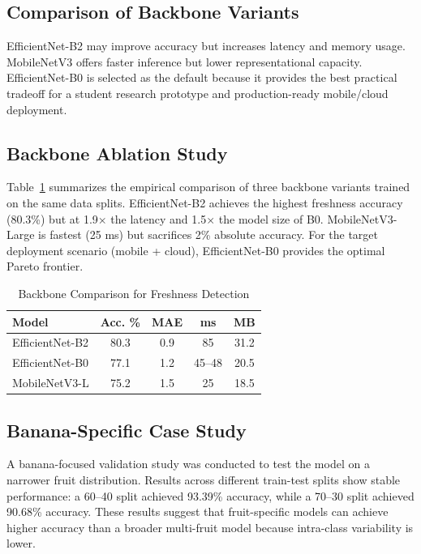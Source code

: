 \documentclass[conference]{IEEEtran}
\begin{document}
\subsection{Comparison of Backbone Variants}
EfficientNet-B2 may improve accuracy but increases latency and memory usage. MobileNetV3 offers faster inference but lower representational capacity. EfficientNet-B0 is selected as the default because it provides the best practical tradeoff for a student research prototype and production-ready mobile/cloud deployment.

\subsection{Backbone Ablation Study}
Table~\ref{tab:model_comparison} summarizes the empirical comparison of three backbone variants trained on the same data splits. EfficientNet-B2 achieves the highest freshness accuracy (80.3\%) but at 1.9$\times$ the latency and 1.5$\times$ the model size of B0. MobileNetV3-Large is fastest (25 ms) but sacrifices 2\% absolute accuracy. For the target deployment scenario (mobile + cloud), EfficientNet-B0 provides the optimal Pareto frontier.

\begin{table}[h]
\centering
\caption{Backbone Comparison for Freshness Detection}
\label{tab:model_comparison}
\begin{tabular}{lcccc}
\toprule
\textbf{Model} & \textbf{Acc. \%} & \textbf{MAE} & \textbf{ms} & \textbf{MB} \\
\midrule
EfficientNet-B2 & 80.3 & 0.9 & 85 & 31.2 \\
EfficientNet-B0 & 77.1 & 1.2 & 45--48 & 20.5 \\
MobileNetV3-L & 75.2 & 1.5 & 25 & 18.5 \\
\bottomrule
\end{tabular}
\end{table}

\subsection{Banana-Specific Case Study}
A banana-focused validation study was conducted to test the model on a narrower fruit distribution. Results across different train-test splits show stable performance: a 60--40 split achieved 93.39\% accuracy, while a 70--30 split achieved 90.68\% accuracy. These results suggest that fruit-specific models can achieve higher accuracy than a broader multi-fruit model because intra-class variability is lower.
\end{document}
